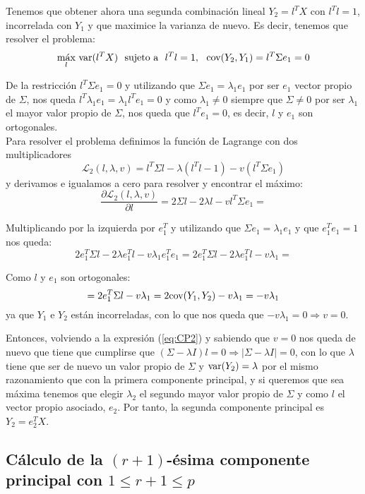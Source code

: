Tenemos que obtener ahora una segunda combinación lineal $Y_2 = l^TX$ con $l^Tl=1$, incorrelada con $Y_1$ y que maximice la varianza de nuevo. Es decir, tenemos que resolver el problema:
\[	\underset{l}{\text{máx}}\ \var{(l^TX)} \ \ \text{sujeto a} \ \  l^Tl = 1,\ \ \cov{(Y_2, Y_1)} = l^T \Sigma e_1 = 0	\]

De la restricción $l^T \Sigma e_1 = 0$ y utilizando que $\Sigma e_1 = \lambda_1 e_1$ por ser $e_1$ vector propio de $\Sigma$, nos queda $l^T \lambda_1 e_1 = \lambda_1 l^T e_1 = 0$ y como $\lambda_1 \neq 0$ siempre que $\Sigma \neq 0$ por ser $\lambda_1$ el mayor valor propio de $\Sigma$, nos queda que $l^T e_1 = 0$, es decir, $l$ y $e_1$ son ortogonales.\\

Para resolver el problema definimos la función de Lagrange con dos multiplicadores
\[	\mathcal{L}_2(l, \lambda, v) = l^T \Sigma l - \lambda (l^Tl - 1) - v(l^T \Sigma e_1) 	\]
y derivamos e igualamos a cero para resolver y encontrar el máximo:
\[	\frac{\partial \mathcal{L}_2(l, \lambda, v)}{\partial l} = 2 \Sigma l - 2 \lambda l - v l^T \Sigma e_1 =	\]

Multiplicando por la izquierda por $e_1^T$ y utilizando que $\Sigma e_1 = \lambda_1 e_1$ y que $e_1^T e_1 = 1$ nos queda:
\begin{equation} \label{eq:CP2}
	2 e_1^T \Sigma l - 2 \lambda e_1^T l - v \lambda_1 e_1^T e_1 = 2 e_1^T \Sigma l - 2 \lambda e_1^T l - v \lambda_1 =
\end{equation}

Como $l$ y $e_1$ son ortogonales:
\[	= 2 e_1^T \Sigma l - v \lambda_1 = 2 \text{cov}{(Y_1, Y_2)} - v \lambda_1 = -v \lambda_1	\]
ya que $Y_1$ e $Y_2$ están incorreladas, con lo que nos queda que $-v \lambda_1 = 0 \Rightarrow v = 0$.

Entonces, volviendo a la expresión (\ref{eq:CP2}) y sabiendo que $v=0$ nos queda de nuevo que tiene que cumplirse que $(\Sigma - \lambda I) l = 0 \Rightarrow |\Sigma - \lambda I| = 0$, con lo que $\lambda$ tiene que ser de nuevo un valor propio de $\Sigma$ y $\text{var}{(Y_2)} = \lambda$ por el mismo razonamiento que con la primera componente principal, y si queremos que sea máxima tenemos que elegir $\lambda_2$ el segundo mayor valor propio de $\Sigma$ y como $l$ el vector propio asociado, $e_2$. Por tanto, la segunda componente principal es $Y_2 = e_2^TX$.

\subsection{Cálculo de la $(r+1)$-ésima componente principal con $1 \leq r+1 \leq p$ }


